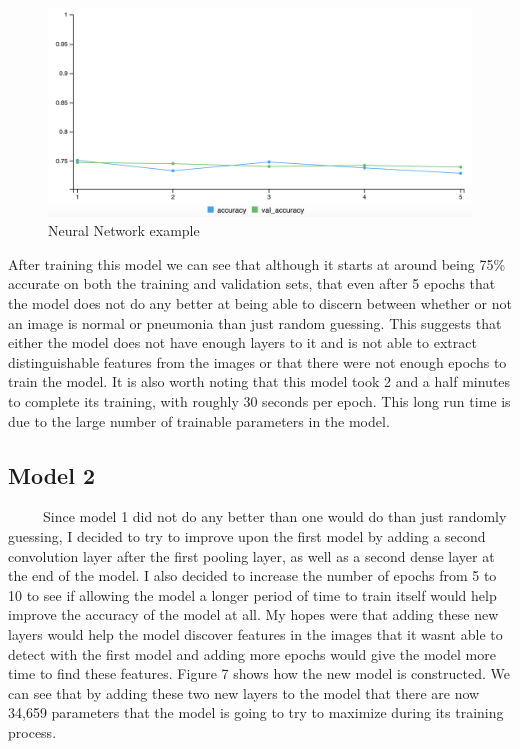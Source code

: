 \documentclass[12pt]{article}
\begin{document}
\begin{figure}

{\centering \includegraphics[width=0.5\linewidth,height=0.25\textheight]{images/model1out} 

}

\caption{Neural Network example}\label{fig:sample-fig6}
\end{figure}

After training this model we can see that although it starts at around
being 75\% accurate on both the training and validation sets, that even
after 5 epochs that the model does not do any better at being able to
discern between whether or not an image is normal or pneumonia than just
random guessing. This suggests that either the model does not have
enough layers to it and is not able to extract distinguishable features
from the images or that there were not enough epochs to train the model.
It is also worth noting that this model took 2 and a half minutes to
complete its training, with roughly 30 seconds per epoch. This long run
time is due to the large number of trainable parameters in the model.

\hypertarget{model-2}{%
\subsection{Model 2}\label{model-2}}

~~~~~Since model 1 did not do any better than one would do than just
randomly guessing, I decided to try to improve upon the first model by
adding a second convolution layer after the first pooling layer, as well
as a second dense layer at the end of the model. I also decided to
increase the number of epochs from 5 to 10 to see if allowing the model
a longer period of time to train itself would help improve the accuracy
of the model at all. My hopes were that adding these new layers would
help the model discover features in the images that it wasnt able to
detect with the first model and adding more epochs would give the model
more time to find these features. Figure 7 shows how the new model is
constructed. We can see that by adding these two new layers to the model
that there are now 34,659 parameters that the model is going to try to
maximize during its training process.
\end{document}
